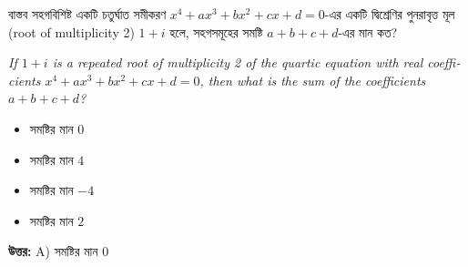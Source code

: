 \documentclass[12pt, a4paper]{article}
\begin{document}
\vspace{1.5em}

\begin{tcolorbox}[questionbox={প্রশ্ন (Question) 49}]
    \noindent
    বাস্তব সহগবিশিষ্ট একটি চতুর্ঘাত সমীকরণ $x^4 + ax^3 + bx^2 + cx + d = 0$-এর একটি দ্বিশ্রেণির পুনরাবৃত্ত মূল (root of multiplicity 2) $1+i$ হলে, সহগসমূহের সমষ্টি $a+b+c+d$-এর মান কত?
    
    \vspace{0.8em}
    \begin{english}
    \noindent\textit{\color{darkgray}
    If $1+i$ is a repeated root of multiplicity 2 of the quartic equation with real coefficients $x^4 + ax^3 + bx^2 + cx + d = 0$, then what is the sum of the coefficients $a+b+c+d$?
    }
    \end{english}
\end{tcolorbox}

\begin{itemize}[label={}, leftmargin=1cm, itemsep=0.5em]
    \item[\textbf{A)}] সমষ্টির মান $0$
    \item[\textbf{B)}] সমষ্টির মান $4$
    \item[\textbf{C)}] সমষ্টির মান $-4$
    \item[\textbf{D)}] সমষ্টির মান $2$
\end{itemize}

\vspace{0.5em}
\begin{tcolorbox}[answerbox]
    \textbf{\color{success} উত্তর:} A) সমষ্টির মান $0$
\end{tcolorbox}
\vspace{1em}
\end{document}
